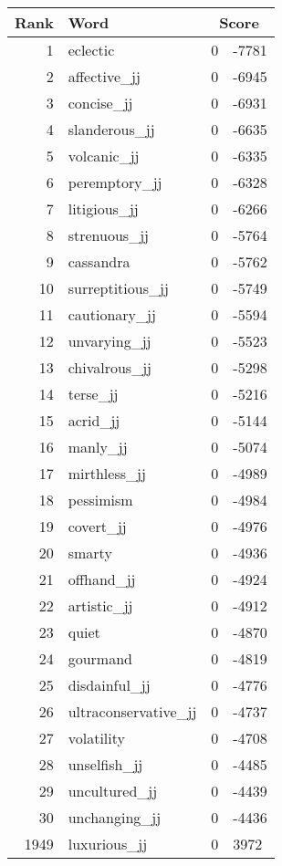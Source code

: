 \begin{longtable}[!htbp]{| rlr@{.}l |}
    \hline
    \textbf{Rank} & \textbf{Word} & \multicolumn{2}{c|}{\textbf{Score}} \\
    \hline
    \endhead
    1 & eclectic & 0 & -7781 \\
    2 & affective\_jj & 0 & -6945 \\
    3 & concise\_jj & 0 & -6931 \\
    4 & slanderous\_jj & 0 & -6635 \\
    5 & volcanic\_jj & 0 & -6335 \\
    6 & peremptory\_jj & 0 & -6328 \\
    7 & litigious\_jj & 0 & -6266 \\
    8 & strenuous\_jj & 0 & -5764 \\
    9 & cassandra & 0 & -5762 \\
    10 & surreptitious\_jj & 0 & -5749 \\
    11 & cautionary\_jj & 0 & -5594 \\
    12 & unvarying\_jj & 0 & -5523 \\
    13 & chivalrous\_jj & 0 & -5298 \\
    14 & terse\_jj & 0 & -5216 \\
    15 & acrid\_jj & 0 & -5144 \\
    16 & manly\_jj & 0 & -5074 \\
    17 & mirthless\_jj & 0 & -4989 \\
    18 & pessimism & 0 & -4984 \\
    19 & covert\_jj & 0 & -4976 \\
    20 & smarty & 0 & -4936 \\
    21 & offhand\_jj & 0 & -4924 \\
    22 & artistic\_jj & 0 & -4912 \\
    23 & quiet & 0 & -4870 \\
    24 & gourmand & 0 & -4819 \\
    25 & disdainful\_jj & 0 & -4776 \\
    26 & ultraconservative\_jj & 0 & -4737 \\
    27 & volatility & 0 & -4708 \\
    28 & unselfish\_jj & 0 & -4485 \\
    29 & uncultured\_jj & 0 & -4439 \\
    30 & unchanging\_jj & 0 & -4436 \\
    1949 & luxurious\_jj & 0 & 3972 \\

\end{longtable}
